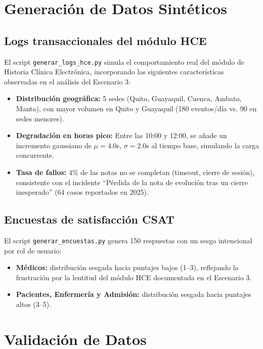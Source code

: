 \documentclass[12pt,a4paper]{article}
\begin{document}
\section{Generaci\'on de Datos Sint\'eticos}

\subsection{Logs transaccionales del m\'odulo HCE}
El script \texttt{generar\_logs\_hce.py} simula el comportamiento real del m\'odulo de Historia Cl\'inica Electr\'onica, incorporando las siguientes caracter\'isticas observadas en el an\'alisis del Escenario 3:

\begin{itemize}
    \item \textbf{Distribuci\'on geogr\'afica:} 5 sedes (Quito, Guayaquil, Cuenca, Ambato, Manta), con mayor volumen en Quito y Guayaquil (180 eventos/d\'ia vs. 90 en sedes menores).
    \item \textbf{Degradaci\'on en horas pico:} Entre las 10:00 y 12:00, se a\~nade un incremento gaussiano de $\mu=4.0$s, $\sigma=2.0$s al tiempo base, simulando la carga concurrente.
    \item \textbf{Tasa de fallos:} 4\% de las notas no se completan (timeout, cierre de sesi\'on), consistente con el incidente ``P\'erdida de la nota de evoluci\'on tras un cierre inesperado'' (64 casos reportados en 2025).
\end{itemize}

\subsection{Encuestas de satisfacci\'on CSAT}
El script \texttt{generar\_encuestas.py} genera 150 respuestas con un sesgo intencional por rol de usuario:
\begin{itemize}
    \item \textbf{M\'edicos:} distribuci\'on sesgada hacia puntajes bajos (1--3), reflejando la frustraci\'on por la lentitud del m\'odulo HCE documentada en el Escenario 3.
    \item \textbf{Pacientes, Enfermer\'ia y Admisi\'on:} distribuci\'on sesgada hacia puntajes altos (3--5).
\end{itemize}

\section{Validaci\'on de Datos}
\end{document}
